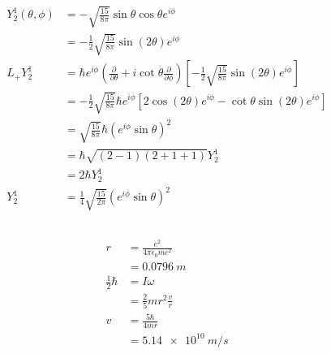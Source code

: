 \documentclass{article}
\begin{document}
\begin{align*}
  Y_2^1(\theta, \phi) & = -\sqrt{\frac{15}{8 \pi}} \sin \theta \cos \theta e^{i \phi}                                                                                                                                    \\
                      & = -\frac{1}{2} \sqrt{\frac{15}{8 \pi}} \sin (2 \theta) e^{i \phi}                                                                                                                                \\
  L_+ Y_2^1           & = \hbar e^{i \phi} \left( \frac{\partial}{\partial \theta} + i \cot \theta \frac{\partial}{\partial \phi} \right) \left[ -\frac{1}{2} \sqrt{\frac{15}{8 \pi}} \sin (2 \theta) e^{i \phi} \right] \\
                      & = -\frac{1}{2} \sqrt{\frac{15}{8 \pi}} \hbar e^{i \phi} [2 \cos(2 \theta) e^{i \phi} - \cot \theta \sin (2 \theta) e^{i \phi}]                                                                   \\
                      & = \sqrt{\frac{15}{8 \pi}} \hbar (e^{i \phi} \sin \theta)^2                                                                                                                                       \\
                      & = \hbar \sqrt{(2 - 1) (2 + 1 + 1)} Y_2^1                                                                                                                                                         \\
                      & = 2 \hbar Y_2^1                                                                                                                                                                                  \\
  Y_2^1               & = \frac{1}{4} \sqrt{\frac{15}{2 \pi}} (e^{i \phi} \sin \theta)^2
\end{align*}

\setcounter{subsection}{27}
\subsection{}

\begin{align*}
  r                 & = \frac{e^2}{4 \pi \epsilon_0 m c^2} \\
                    & = \qty{0.0796}{m}                    \\
  \frac{1}{2} \hbar & = I \omega                           \\
                    & = \frac{2}{5} m r^2 \frac{v}{r}      \\
  v                 & = \frac{5 \hbar}{4 m r}              \\
                    & = \qty{5.14e10}{m/s}
\end{align*}
\end{document}
